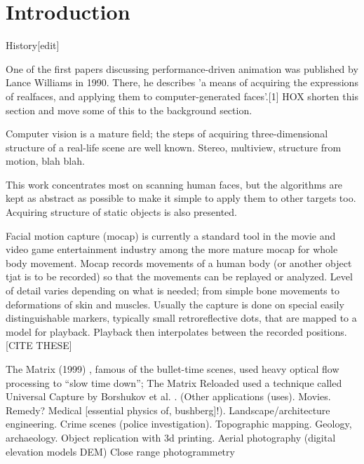\section{Introduction}

\thispagestyle{empty}
History[edit]

One of the first papers discussing performance-driven animation was published by Lance Williams in 1990. There, he describes 'a means of acquiring the expressions of realfaces, and applying them to computer-generated faces'.[1]
HOX shorten this section and move some of this to the background section.

Computer vision is a mature field; the steps of acquiring three-dimensional structure of a real-life scene are well known.
Stereo, multiview, structure from motion, blah blah.

This work concentrates most on scanning human faces, but the algorithms are kept as abstract as possible to make it simple to apply them to other targets too.
Acquiring structure of static objects is also presented.

Facial motion capture (mocap) is currently a standard tool in the movie and video game entertainment industry among the more mature mocap for whole body movement.
Mocap records movements of a human body (or another object tjat is to be recorded) so that the movements can be replayed or analyzed.
Level of detail varies depending on what is needed; from simple bone movements to deformations of skin and muscles.
Usually the capture is done on special easily distinguishable markers, typically small retroreflective dots, that are mapped to a model for playback. Playback then interpolates between the recorded positions. [CITE THESE]

The Matrix (1999) \cite{wachowski99matrix}, famous of the bullet-time scenes, used heavy optical flow processing to ``slow time down''; The Matrix Reloaded \cite{wachowski03reloaded} used a technique called Universal Capture by Borshukov et al. \cite{borshukov05universal}.
(Other applications (uses). Movies. Remedy? Medical [essential physics of, bushberg]!). Landscape/architecture engineering. Crime scenes (police investigation). Topographic mapping. Geology, archaeology. Object replication with 3d printing. Aerial photography (digital elevation models DEM)
Close range photogrammetry

